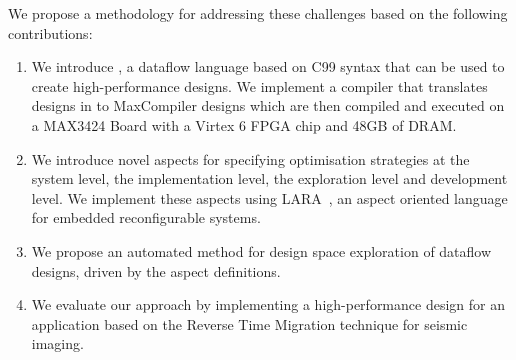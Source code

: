 We propose a methodology for addressing these challenges based on the
following contributions:
\begin{enumerate}
\item We introduce \MAXC{}, a dataflow language based on C99 syntax
  that can be used to create high-performance designs. We implement a
  compiler that translates designs in \MAXC{} to MaxCompiler designs
  which are then compiled and executed on a MAX3424 Board with a
  Virtex 6 FPGA chip and 48GB of DRAM.
\item We introduce novel aspects for specifying optimisation
  strategies at the system level, the implementation level, the
  exploration level and development level. We implement these aspects
  using
  LARA~\cite{Cardoso:Carvalho:Cutinho:Luk:Nobre:Diniz:Petrov:2012}, an
  aspect oriented language for embedded reconfigurable systems.
\item We propose an automated method for design space exploration of
  \MAXC{} dataflow designs, driven by the aspect definitions.
\item We evaluate our approach by implementing a high-performance
  design for an application based on the Reverse Time Migration
  technique for seismic imaging.
\end{enumerate}
